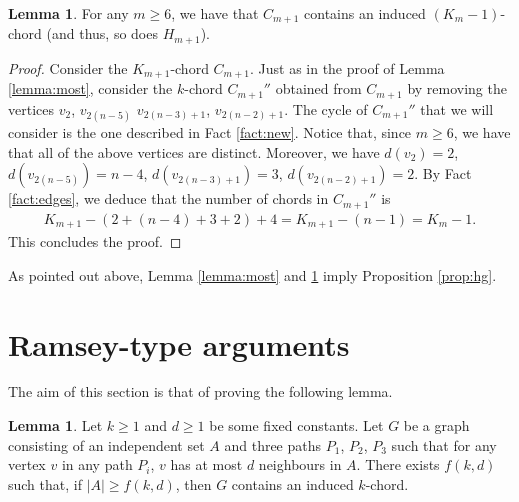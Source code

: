 \documentclass[12pt]{article}
\theoremstyle{definition}
\newtheorem{lemma}[thm]{Lemma}
\begin{document}
    \begin{lemma} \label{lemma:remainder}
        For any $m \geq 6$, we have that $C_{m+1}$ contains
        an induced $\left(K_{m} - 1\right)$-chord
        (and thus, so does $H_{m+1}$).
    \end{lemma}
    \begin{proof}
        Consider the $K_{m+1}$-chord $C_{m+1}$.
        Just as in the proof of Lemma \ref{lemma:most},
        consider the $k$-chord $C_{m+1}''$ obtained
        from $C_{m+1}$ by removing the vertices
        $v_2$, $v_{2\left(n-5\right)}$
        $v_{2\left(n-3\right)+1}$, $v_{2\left(n-2\right)+1}$.
        The cycle of $C_{m+1}''$ that
        we will consider is the one
        described in Fact \ref{fact:new}.
        Notice that, since $m \geq 6$, we have
        that all of the above vertices
        are distinct. Moreover, we have
        $d\left(v_2\right) = 2$, 
        $d\left(v_{2\left(n-5\right)}\right) = n-4$,
        $d\left(v_{2\left(n-3\right)+1}\right)=3$,
        $d\left(v_{2\left(n-2\right)+1}\right) = 2$.
        By Fact \ref{fact:edges}, 
        we deduce that the number of chords
        in $C_{m+1}''$ is
        \begin{gather*}
            K_{m+1} - \left(2 + \left(n-4\right)
            + 3 + 2\right) + 4 =
            K_{m+1} - \left(n-1\right) = K_{m} -1.
        \end{gather*}
        This concludes the proof.
    \end{proof}

    As pointed out above, Lemma
    \ref{lemma:most} and \ref{lemma:remainder}
    imply Proposition \ref{prop:hg}.

    \section{Ramsey-type arguments}

    The aim of this section is that of
    proving the following lemma.

    \begin{lemma} \label{lemma:paths}
        Let $k \geq 1$ and $d \geq 1$ 
        be some fixed constants.
        Let $G$ be a graph consisting
        of an independent set $A$ 
        and three paths $P_1$, $P_2$, $P_3$
        such that for any vertex $v$ 
        in any path $P_{i}$,
        $v$ has at most $d$ neighbours
        in $A$. There exists
        $f\left(k, d\right)$ such
        that, if $\left|A\right| \geq f\left(k, d\right)$,
        then $G$ contains an
        induced $k$-chord.
    \end{lemma}
\end{document}
